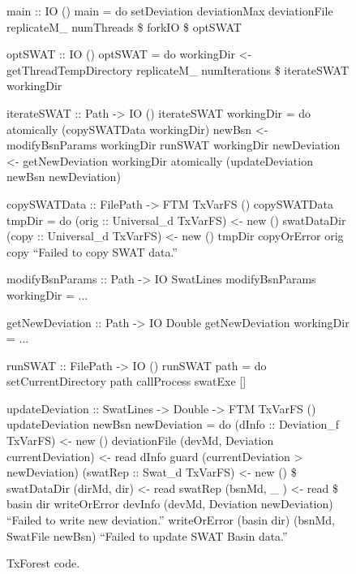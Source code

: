 \begin{figure}
\begin{code}
main :: IO ()
main = do
  setDeviation deviationMax deviationFile  
  replicateM_ numThreads \$ forkIO \$ optSWAT

\mbox{}
optSWAT :: IO ()
optSWAT = do
  workingDir <- getThreadTempDirectory
  replicateM_ numIterations \$ iterateSWAT workingDir

\mbox{}
iterateSWAT :: Path -> IO ()
iterateSWAT workingDir = do
  atomically (copySWATData workingDir)
  newBsn <- modifyBsnParams workingDir
  runSWAT workingDir
  newDeviation <- getNewDeviation workingDir
  atomically (updateDeviation newBsn newDeviation)

\mbox{}
copySWATData :: FilePath -> FTM TxVarFS ()
copySWATData tmpDir = do
    (orig :: Universal_d TxVarFS) <- new () swatDataDir
    (copy :: Universal_d TxVarFS) <- new () tmpDir
    copyOrError orig copy ``Failed to copy SWAT data.''

\mbox{}
modifyBsnParams :: Path -> IO SwatLines
modifyBsnParams workingDir = ...

\mbox{}
getNewDeviation :: Path -> IO Double
getNewDeviation workingDir = ...

\mbox{}
runSWAT :: FilePath -> IO ()
runSWAT path = do
  setCurrentDirectory path
  callProcess swatExe []

\mbox{}
updateDeviation :: SwatLines -> Double -> FTM TxVarFS ()
updateDeviation newBsn newDeviation =  do
  (dInfo :: Deviation_f TxVarFS) <- new () deviationFile
  (devMd, Deviation currentDeviation) <- read dInfo
  guard (currentDeviation > newDeviation)
  (swatRep :: Swat_d TxVarFS) <- new () \$ swatDataDir
  (dirMd, dir) <- read swatRep
  (bsnMd, _  ) <- read \$ basin dir
  writeOrError devInfo     (devMd, Deviation newDeviation) 
               ``Failed to write new deviation.''
  writeOrError (basin dir) (bsnMd, SwatFile  newBsn)       
               ``Failed to update SWAT Basin data.''


\end{code}
\caption{TxForest code.}
\label{fig:SWAT-code}
\end{figure}



